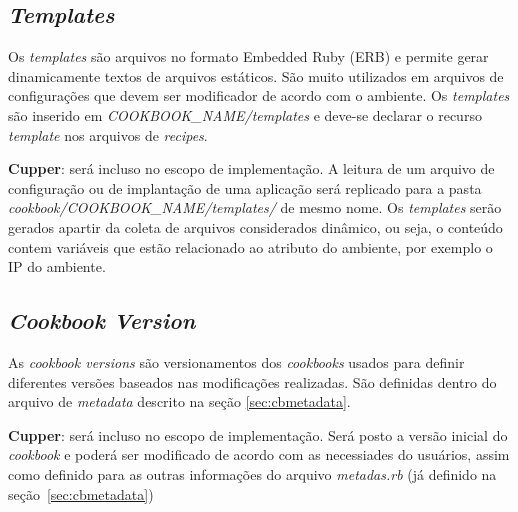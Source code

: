 \subsection{\textit{Templates}}

Os \textit{templates} são arquivos no formato Embedded Ruby (ERB) e permite gerar
dinamicamente textos de arquivos estáticos. São muito utilizados em arquivos
de configurações que devem ser modificador de acordo com o ambiente. Os
\textit{templates} são inserido em \textit{COOKBOOK\_NAME/templates} e deve-se declarar o recurso
\textit{template} nos arquivos de \textit{recipes}.

\textbf{Cupper}: será incluso no escopo de implementação. A leitura de um arquivo de
configuração ou de implantação de uma aplicação será replicado para a
pasta \textit{cookbook/COOKBOOK\_NAME/templates/} de mesmo nome. Os \textit{templates} serão
gerados apartir da coleta de arquivos considerados din{\^a}mico, ou seja,
o conteúdo contem variáveis que estão relacionado ao atributo do ambiente,
por exemplo o IP do ambiente.

\subsection{\textit{Cookbook Version}}

As \textit{cookbook versions} são versionamentos dos \textit{cookbooks} usados para definir
diferentes versões baseados nas modificações realizadas. São definidas
  dentro do arquivo de \textit{metadata} descrito na seção \ref{sec:cbmetadata}.

\textbf{Cupper}: será incluso no escopo de implementação. Será posto a versão inicial
do \textit{cookbook} e poderá ser modificado de acordo com as necessiades do usuários,
assim como definido para as outras informações do arquivo \textit{metadas.rb} (já definido
na seção~\ref{sec:cbmetadata})

